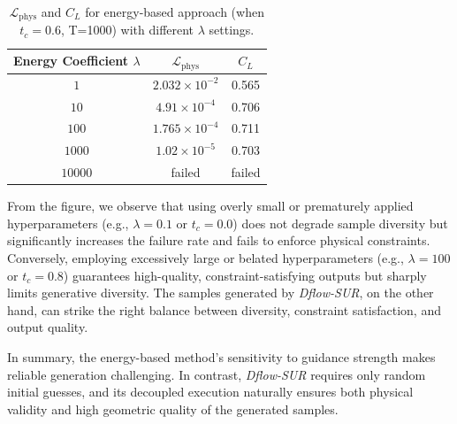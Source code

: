 \begin{table}[!tbp]
    \centering
    \caption{$\mathcal{L}_{\mathrm{phys}}$ and $C_L$ for energy-based approach (when $t_c = 0.6$, T=1000) with different $\lambda$ settings.}
    \label{ch7:tab:energy_diff_lambda}
    \begin{tabular}{c c c}
        \toprule
        Energy Coefficient $\lambda$ & $\mathcal{L}_{\mathrm{phys}}$ & $C_L$ \\
        \midrule
        $1$      & $2.032 \times 10^{-2}$  & 0.565  \\
        $10$     &  $4.91 \times 10^{-4}$ & 0.706  \\
        $100$    &  $1.765 \times 10^{-4}$& 0.711\\
        $1000$   & $1.02 \times 10^{-5}$ & 0.703 \\
        $10000$  & failed & failed\\
        \bottomrule
    \end{tabular}
\end{table}

From the figure, we observe that using overly small or prematurely applied hyperparameters (e.g., $\lambda = 0.1$ or $t_c = 0.0$) does not degrade sample diversity but significantly increases the failure rate and fails to enforce physical constraints. Conversely, employing excessively large or belated hyperparameters (e.g., $\lambda = 100$ or $t_c = 0.8$) guarantees high-quality, constraint-satisfying outputs but sharply limits generative diversity. The samples generated by \textit{Dflow-SUR}, on the other hand, can strike the right balance between diversity, constraint satisfaction, and output quality.


In summary, the energy-based method’s sensitivity to guidance strength makes reliable generation challenging. In contrast, \textit{Dflow-SUR} requires only random initial guesses, and its decoupled execution naturally ensures both physical validity and high geometric quality of the generated samples.

